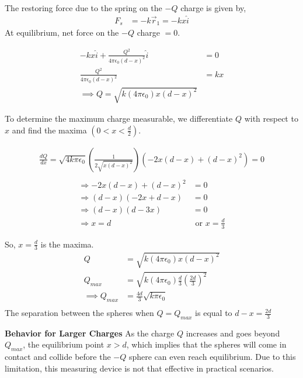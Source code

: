 \documentclass[12pt]{article}
\providecommand{\brak}[1]{\ensuremath{\left(#1\right)}}
\begin{document}
The restoring force due to the spring on the $-Q$ charge is given by,
\begin{align}
F_s &= -k\vec{r}_1 = -kx \hat{i}
\end{align}
At equilibrium, net force on the $-Q$ charge $= 0$.

\begin{align*}
    -kx\hat{i} + \frac{Q^2}{4\pi\epsilon_0 (d-x)^2} \hat{i} &= 0 \\
    \frac{Q^2}{4\pi\epsilon_0 (d-x)^2} &= kx \\
    \implies Q = \sqrt{k(4\pi\epsilon_0)x(d-x)^2}
\end{align*}

To determine the maximum charge measurable, we differentiate $Q$ with respect to $x$ and find the maxima $\brak{0 < x < \frac{d}{2}}$.

\begin{align*}
    \frac{dQ}{dx} = \sqrt{4k\pi\epsilon_0} \left( \frac{1}{2 \sqrt{x(d-x)^2}} \right) \left( -2x(d-x) + (d-x)^2 \right) = 0 \\
\end{align*}
\begin{align*}
\Rightarrow -2x(d-x) + (d-x)^2 &= 0 \\
\Rightarrow (d-x)(-2x + d - x) &= 0 \\
\Rightarrow (d-x)(d-3x) &= 0 \\
\Rightarrow x = d &\text{ or } x = \frac{d}{3}
\end{align*}

So, $x = \frac{d}{3}$ is the maxima. 
\begin{align*}
    Q &= \sqrt{k(4\pi\epsilon_0)x\brak{d-x}^2}\\
    Q_{max} &= \sqrt{k(4\pi\epsilon_0)\frac{d}{3}\brak{\frac{2d}{3}}^2}\\
    \implies Q_{max} &= \frac{4d}{3}\sqrt{k\pi\epsilon_0}\\
\end{align*}
The separation between the spheres when $Q = Q_{max}$ is equal to $d - x = \frac{2d}{3}$

\textbf{Behavior for Larger Charges}
\newline
As the charge $Q$ increases and goes beyond $Q_{max}$, the equilibrium point $x > d$, which implies that the spheres will come in contact and collide before the $-Q$ sphere can even reach equilibrium.
\newline
Due to this limitation, this measuring device is not that effective in practical scenarios.
\end{document}

